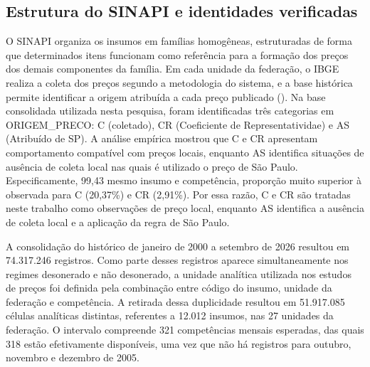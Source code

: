 \subsection{Estrutura do SINAPI e identidades verificadas}

O SINAPI organiza os insumos em famílias homogêneas, estruturadas de forma que 
determinados itens funcionam como referência para a formação dos preços dos demais 
componentes da família. Em cada unidade da federação, o IBGE realiza a coleta dos 
preços segundo a metodologia do sistema, e a base histórica permite identificar a 
origem atribuída a cada preço publicado (). 
Na base consolidada utilizada nesta pesquisa, foram identificadas três categorias em 
ORIGEM_PRECO: C (coletado), CR (Coeficiente de Representatividae) e AS (Atribuído de SP). 
A análise empírica mostrou que C e CR apresentam 
comportamento compatível com preços locais, enquanto AS identifica situações de 
ausência de coleta local nas quais é utilizado o preço de São Paulo. Especificamente, 
99,43%
mesmo insumo e competência, proporção muito superior à observada para C (20,37\%) e 
CR (2,91\%). Por essa razão, C e CR são tratadas neste trabalho como observações de 
preço local, enquanto AS identifica a ausência de coleta local e a aplicação da regra 
de São Paulo.

A consolidação do histórico de janeiro de 2000 a setembro de 2026 resultou em 
74.317.246 registros. Como parte desses registros aparece simultaneamente nos 
regimes desonerado e não desonerado, a unidade analítica utilizada nos estudos 
de preços foi definida pela combinação entre código do insumo, unidade da federação e 
competência. A retirada dessa duplicidade resultou em 51.917.085 células analíticas 
distintas, referentes a 12.012 insumos, nas 27 unidades da federação. O intervalo 
compreende 321 competências mensais esperadas, das quais 318 estão efetivamente 
disponíveis, uma vez que não há registros para outubro, novembro e dezembro de 2005.

